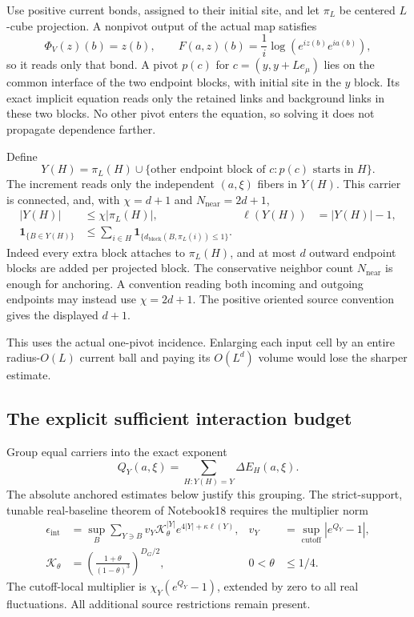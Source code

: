 \documentclass[11pt]{article}
\theoremstyle{remark}
\begin{document}
Use positive current bonds, assigned to their initial site, and
let $\pi_L$ be centered $L$-cube projection. A nonpivot output
of the actual map satisfies
\[
 \Phi_V(z)(b)=z(b),\qquad
 F(a,z)(b)=\frac1i\log(e^{iz(b)}e^{ia(b)}),
\]
so it reads only that bond. A pivot $p(c)$ for
$c=(y,y+Le_\mu)$ lies on the common interface of the two
endpoint blocks, with initial site in the $y$ block. Its exact
implicit equation reads only the retained links and background
links in these two blocks. No other pivot enters the equation,
so solving it does not propagate dependence farther.

Define
\begin{equation}\label{qi-projected-carrier}
 Y(H)=\pi_L(H)\cup
 \{\text{other endpoint block of }c: p(c)\text{ starts in }H\}.
\end{equation}
The increment reads only the independent $(a,\xi)$ fibers in
$Y(H)$. This carrier is connected, and, with
$\chi=d+1$ and $N_{\mathrm{near}}=2d+1$,
\begin{align}
 |Y(H)|&\le\chi|\pi_L(H)|,
 &\ell(Y(H))&=|Y(H)|-1,                              \label{qi-projected-size}\\
 \mathbf1_{\{B\in Y(H)\}}
 &\le\sum_{i\in H}\mathbf1_{\{d_{\mathrm{block}}(B,\pi_L(i))\le1\}}.
                                                               \label{qi-projected-anchor}
\end{align}
Indeed every extra block attaches to $\pi_L(H)$, and at most
$d$ outward endpoint blocks are added per projected block.
The conservative neighbor count $N_{\mathrm{near}}$ is enough
for anchoring. A convention reading both incoming and outgoing
endpoints may instead use $\chi=2d+1$. The positive oriented
source convention gives the displayed $d+1$.

This uses the actual one-pivot incidence. Enlarging each input
cell by an entire radius-$O(L)$ current ball and paying its
$O(L^d)$ volume would lose the sharper estimate.

\subsection{The explicit sufficient interaction budget}

Group equal carriers into the exact exponent
\begin{equation}\label{qi-grouped-exponent}
 Q_Y(a,\xi)=\sum_{H:Y(H)=Y}\Delta E_H(a,\xi).
\end{equation}
The absolute anchored estimates below justify this grouping.
The strict-support, tunable real-baseline theorem of Notebook18
requires the multiplier norm
\begin{align}
 \epsilon_{\mathrm{int}}
 &=\sup_B\sum_{Y\ni B}v_Y\mathcal K_\theta^{|Y|}
                       e^{4|Y|+\kappa\ell(Y)},
 &v_Y&=\sup_{\mathrm{cutoff}}|e^{Q_Y}-1|,              \label{qi-integration-norm}\\
 \mathcal K_\theta
 &=\left(\frac{1+\theta}{(1-\theta)^3}\right)^{D_G/2},
 &0<\theta&\le1/4.                                    \label{qi-density-cost}
\end{align}
The cutoff-local multiplier is
$\chi_Y(e^{Q_Y}-1)$, extended by zero to all real fluctuations.
All additional source restrictions remain present.
\end{document}
